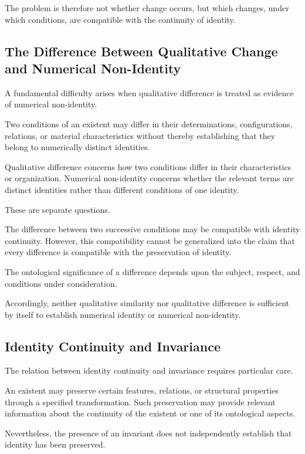 The problem is therefore not whether change
occurs, but which changes, under which conditions,
are compatible with the continuity of identity.

\subsection{The Difference Between Qualitative Change and Numerical Non-Identity}

A fundamental difficulty arises when qualitative
difference is treated as evidence of numerical
non-identity.

Two conditions of an existent may differ in
their determinations, configurations, relations,
or material characteristics without thereby
establishing that they belong to numerically
distinct identities.

Qualitative difference concerns how two conditions
differ in their characteristics or organization.
Numerical non-identity concerns whether the
relevant terms are distinct identities rather
than different conditions of one identity.

These are separate questions.

The difference between two successive conditions
may be compatible with identity continuity.
However, this compatibility cannot be generalized
into the claim that every difference is compatible
with the preservation of identity.

The ontological significance of a difference
depends upon the subject, respect, and conditions
under consideration.

Accordingly, neither qualitative similarity
nor qualitative difference is sufficient by
itself to establish numerical identity or
numerical non-identity.

\subsection{Identity Continuity and Invariance}

The relation between identity continuity and
invariance requires particular care.

An existent may preserve certain features,
relations, or structural properties through
a specified transformation. Such preservation
may provide relevant information about the
continuity of the existent or one of its
ontological aspects.

Nevertheless, the presence of an invariant
does not independently establish that identity
has been preserved.


